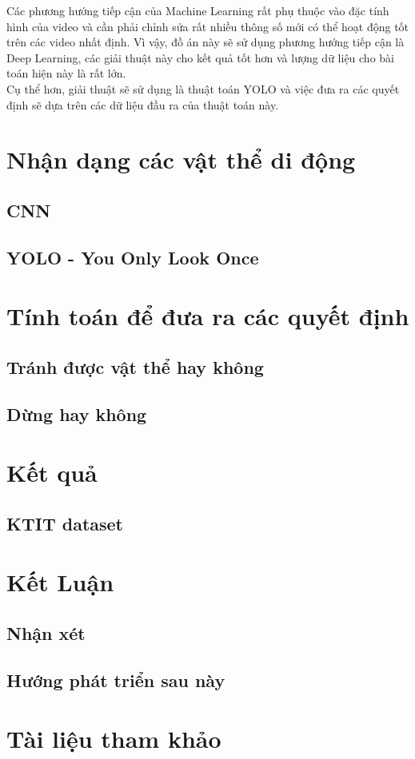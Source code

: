 \documentclass[a4paper,10pt]{article}
\begin{document}
Các phương hướng tiếp cận của Machine Learning rất phụ thuộc vào đặc tính hình của video và cần phải chỉnh sửa rất nhiều thông số mới có thể hoạt động tốt trên các video nhất định. Vì vậy, đồ án này sẽ sử dụng phương hướng tiếp cận là Deep Learning, các giải thuật này cho kết quả tốt hơn và lượng dữ liệu cho bài toán hiện này là rất lớn.
\\
Cụ thể hơn, giải thuật sẽ sử dụng là thuật toán YOLO và việc đưa ra các quyết định sẽ dựa trên các dữ liệu đầu ra của thuật toán này.

\section{Nhận dạng các vật thể di động}
    \subsection{CNN}
	\subsection{YOLO - You Only Look Once}
\section{Tính toán để đưa ra các quyết định}
	\subsection{Tránh được vật thể hay không}
	\subsection{Dừng hay không}
\section{Kết quả}
    \subsection{KTIT dataset}
\section{Kết Luận}
    \subsection{Nhận xét}
    \subsection{Hướng phát triển sau này}
\section{Tài liệu tham khảo}
\end{document}
